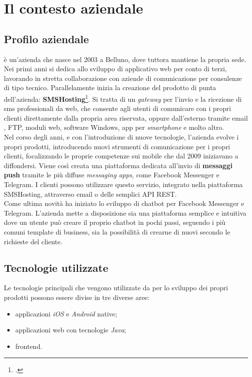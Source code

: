 
\chapter{Il contesto aziendale}
\label{cap:contesto-aziendale}

\section{Profilo aziendale}
\azienda{} è un'azienda che nasce nel 2003 a Belluno, dove tuttora mantiene la propria sede. Nei primi anni si dedica allo sviluppo di applicativo web per conto di terzi, lavorando in stretta collaborazione con aziende di comunicazione per consulenze di tipo tecnico. Parallelamente inizia la creazione del prodotto di punta dell'azienda: \textbf{SMSHosting}\footcite{smshosting}. Si tratta di un \emph{gateway} per l'invio e la ricezione di sms professionali da web, che consente agli utenti di comunicare con i propri clienti direttamente dalla propria area riservata, oppure dall'esterno tramite email , \gls{FTP}, moduli web, software Windows, app per \emph{smartphone} e molto altro.  \\
Nel corso degli anni, e con l'introduzione di nuove tecnologie, l'azienda evolve i propri prodotti, introducendo nuovi strumenti di comunicazione per i propri clienti, focalizzando le proprie competenze sui mobile che dal 2009 iniziavano a diffondersi.
Viene così creata una piattaforma dedicata all'invio di \textbf{messaggi \gls{push}} tramite le più diffuse \emph{messaging apps}, come Facebook Messenger e Telegram. I clienti possono utilizzare questo servizio, integrato nella piattaforma SMSHosting, attraverso email o delle semplici \gls{API} REST.\\
Come ultima novità \azienda{} ha iniziato lo sviluppo di \gls{chatbot} per Facebook Messenger e Telegram. L'azienda mette a disposizione sia una piattaforma semplice e intuitiva dove un utente può creare il proprio \gls{chatbot} in pochi passi, seguendo i più comuni template di business, sia la possibilità di crearne di nuovi secondo le richieste del cliente.

\section{Tecnologie utilizzate}
Le tecnologie principali che vengono utilizzate da \azienda{} per lo sviluppo dei propri prodotti possono essere divise in tre diverse aree:
\begin{itemize}
	\item applicazioni \emph{iOS} e \emph{Android} native;
	\item applicazioni web con tecnologie \emph{Java};
	\item \gls{frontend}.
\end{itemize} 

